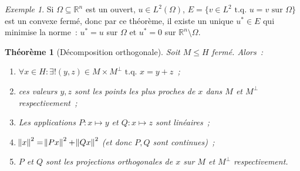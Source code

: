 \documentclass{report}
\newcommand{\R}{{\mathbb R}}
\newcommand{\tq}{\text{ t.q. }}
\newtheorem{thm}{Théorème}[chapter]
\theoremstyle{definition}
\theoremstyle{remark}
\newtheorem{ex}{Exemple}[chapter]
\begin{document}
\begin{ex} Si $\Omega \subseteq \R^n$ est un ouvert, $u \in L^2(\Omega)$, $E = \{v \in L^2 \tq u=v \text{ sur } \Omega\}$ est un convexe fermé, donc par ce théorème,
il existe un unique $u^* \in E$ qui minimise la norme~: $u^* = u$ sur $\Omega$ et $u^*=0$ sur $\R^n \setminus \Omega$.
\end{ex}

\begin{thm}[Décomposition orthogonale] Soit $M \leq H$ fermé. Alors~:
\begin{enumerate}
	\item $\forall x \in H : \exists! (y, z) \in M \times M^\perp \tq x=y+z$~;
	\item ces valeurs $y, z$ sont les points les plus proches de $x$ dans $M$ et $M^\perp$ respectivement~;
	\item Les applications $P : x \mapsto y$ et $Q : x \mapsto z$ sont linéaires~;
	\item $\norm x^2 = \norm {Px}^2 + \norm {Qx}^2$ (et donc $P,Q$ sont continues)~;
	\item $P$ et $Q$ sont les projections orthogonales de $x$ sur $M$ et $M^\perp$ respectivement.
\end{enumerate}
\end{thm}
\end{document}
